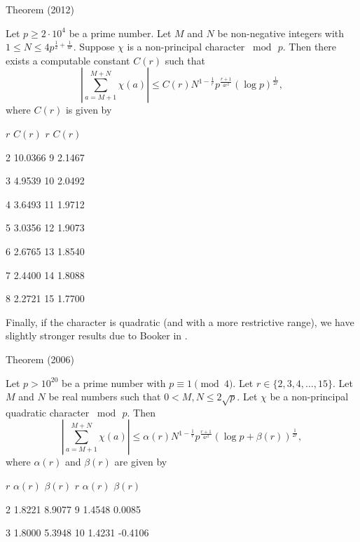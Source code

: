 \begin{thm}{Theorem (2012)}

Let $p\ge 2\cdot 10^{4}$ be a prime number. Let $M$ and $N$ be
non-negative integers with $1\le N\le 4 p^{\frac{1}{2} +
\frac{1}{4r}}$. Suppose $\chi$ is a non-principal character
$\bmod{\,p}$. Then there exists a computable constant $C(r)$ such that
$$
\left|\sum_{a=M+1}^{M+N}\chi(a)\right|
\le
C(r) N^{1-\frac{1}{r}} p^{\frac{r+1}{4r^2}}(\log{p})^{\frac{1}{2r}},
$$
where $C(r)$ is given by

  
    
      
	$r$
	$C(r)$
	$r$
	$C(r)$
      
    
    
      2
      10.0366
      9
      2.1467
    
    
      3
       4.9539
      10
      2.0492
    
    
      4
      3.6493
      11
      1.9712
    
    
      5
      3.0356
      12
      1.9073
    
    
      6
      2.6765
      13
      1.8540
    
    
      7
      2.4400
      14
      1.8088
    
    
      8
      2.2721
      15
      1.7700
    
  






Finally, if the character is quadratic (and with a more restrictive
range), we have slightly stronger results due to Booker in  
\cite{Booker*06}.

Theorem (2006)


Let $p > 10^{20}$ be a prime number with $p \equiv 1 \pmod{4}$. Let
$r\in \{2,3,4,\ldots,15\}$. Let $M$ and $N$ be real numbers such that
$0 < M , N \le 2\sqrt{p}$. Let $\chi$ be a non-principal quadratic
character $\bmod{\,p}$.  Then
$$
\left|\sum_{a=M+1}^{M+N}\chi(a)\right|
\le \alpha(r) N^{1-\frac{1}{r}} p^{\frac{r+1}{4r^2}}\left(\log{p} +
     \beta(r)\right)^{\frac{1}{2r}},
$$
     where $\alpha(r)$ and $\beta(r)$ are given by

  
  
    
      $r$
      $\alpha(r)$
      $\beta(r)$
      $r$
      $\alpha(r)$
      $\beta(r)$
    
  
  
    2
    1.8221
    8.9077
    9
    1.4548
    0.0085
  
  
    3
    1.8000
    5.3948
    10
    1.4231
    -0.4106
  

\end{thm}

